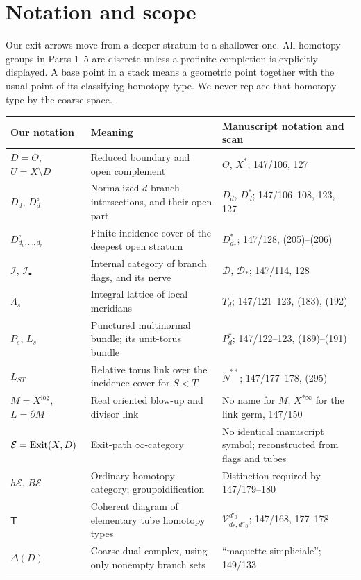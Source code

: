 \section*{Notation and scope}
Our exit arrows move from a deeper stratum to a shallower one.  All homotopy
groups in Parts 1--5 are discrete unless a profinite completion is explicitly
displayed.  A base point in a stack means a geometric point together with the
usual point of its classifying homotopy type.  We never replace that homotopy
type by the coarse space.

\begin{center}\small
\begin{tabular}{p{}p{}p{}}
\toprule
Our notation & Meaning & Manuscript notation and scan \\
\midrule
$D=\Theta$, $U=X\setminus D$ & Reduced boundary and open complement &
 $\Theta$, $X^*$; 147/106, 127 \\
$D_d$, $D_d^\circ$ & Normalized $d$-branch intersections, and their open part &
 $D_d$, $D_d^*$; 147/106--108, 123, 127 \\
$D_{d_0,\ldots,d_r}^\circ$ & Finite incidence cover of the deepest open stratum &
 $D_{d_*}^*$; 147/128, (205)--(206) \\
$\mathcal I$, $\mathcal I_\bullet$ & Internal category of branch flags, and its nerve &
 $\mathcal D$, $\mathcal D_*$; 147/114, 128 \\
$\Lambda_s$ & Integral lattice of local meridians &
 $T_d$; 147/121--123, (183), (192) \\
$P_s$, $L_s$ & Punctured multinormal bundle; its unit-torus bundle &
 $P_d^*$; 147/122--123, (189)--(191) \\
$L_{ST}$ & Relative torus link over the incidence cover for $S<T$ &
 $\breve N^{**}$; 147/177--178, (295) \\
$M=X^{\log}$, $L=\partial M$ & Real oriented blow-up and divisor link &
 No name for $M$; $X^{*\infty}$ for the link germ, 147/150 \\
$\mathcal E=\operatorname{Exit}(X,D)$ & Exit-path $\infty$-category &
 No identical manuscript symbol; reconstructed from flags and tubes \\
$h\mathcal E$, $B\mathcal E$ & Ordinary homotopy category; groupoidification &
 Distinction required by 147/179--180 \\
$\mathsf T$ & Coherent diagram of elementary tube homotopy types &
 $\mathcal V^{d'_0}_{d_*,d''_0}$; 147/168, 177--178 \\
$\Delta(D)$ & Coarse dual complex, using only nonempty branch sets &
 ``maquette simpliciale''; 149/133 \\
\bottomrule
\end{tabular}
\end{center}

